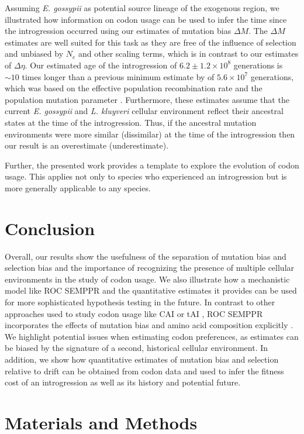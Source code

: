 \documentclass[doublespacing,linenumbers]{bmcart-modified}
\newcommand{\kluyveri}{\textit{L. kluyveri}\xspace}
\newcommand{\gossypii}{\textit{E. gossypii}\xspace}
\newcommand{\ROC}{ROC SEMPPR\xspace}
\newcommand{\DM}{\ensuremath{{\Delta M}}\xspace}
\newcommand{\DE}{\ensuremath{{\Delta \eta}}\xspace}
\newcommand{\Ne}{\ensuremath{N_e}\xspace}
\begin{document}
Assuming \gossypii as potential source lineage of the exogenous region, we illustrated how information on codon usage can be used to infer the time since the introgression occurred using our estimates of mutation bias \DM.
The \DM estimates are well suited for this task as they are free of the influence of selection and unbiased by $\Ne$ and other scaling terms, which is in contrast to our estimates of \DE \citep{gilchrist2015}.
Our estimated age of the introgression of $6.2\pm1.2\times 10^8$ generations is $\sim 10$ times longer than a previous minimum estimate by \cite{friedrich2015} of $5.6\times 10^7$ generations, which was based on the effective population recombination rate and the population mutation parameter \citep{Ruderfer2006}.
Furthermore, these estimates assume that the current \gossypii and \kluyveri cellular environment reflect their ancestral states at the time of the introgression.
Thus, if the ancestral mutation environments were more similar (dissimilar) at the time of the introgression then our result is an overestimate (underestimate).

Further, the presented work provides a template to explore the evolution of codon usage.
This applies not only to species who experienced an introgression but is more generally applicable to any species.

\section*{Conclusion}
Overall, our results show the usefulness of the separation of mutation bias and selection bias and the importance of recognizing the presence of multiple cellular environments in the study of codon usage.
We also illustrate how a mechanistic model like \ROC and the quantitative estimates it provides can be used for more sophisticated hypothesis testing in the future.
In contrast to other approaches used to study codon usage like CAI \citep{sharp1987} or tAI \citep{dosreis2004}, \ROC incorporates the effects of mutation bias and amino acid composition explicitly \citep{cope2018}.
We highlight potential issues when estimating codon preferences, as estimates can be biased by the signature of a second, historical cellular environment.
In addition, we show how quantitative estimates of mutation bias and selection relative to drift can be obtained from codon data and used to infer the fitness cost of an introgression as well as its history and potential future.

\section*{Materials and Methods}
\end{document}
